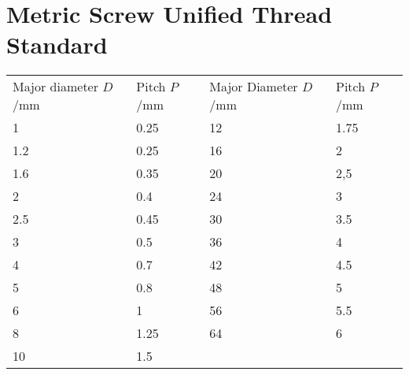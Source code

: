 \documentclass{article}
\begin{document}
\section{Metric Screw Unified Thread Standard}

\begin{tabular}{@{}llll@{}}
 Major diameter $D$/mm & Pitch $P$/mm & Major Diameter $D$/mm & Pitch $P$/mm \\
 1 & 0.25 & 12 & 1.75 \\
 1.2 & 0.25 & 16 & 2 \\
 1.6 & 0.35 & 20 & 2,5\\
 2 & 0.4 & 24 & 3 \\
 2.5 & 0.45 & 30 & 3.5\\
 3 & 0.5 & 36 & 4\\
 4 & 0.7 & 42 & 4.5\\
 5 & 0.8 & 48 & 5 \\
 6 & 1 & 56 & 5.5 \\
 8 & 1.25 & 64 & 6 \\
 10 & 1.5
\end{tabular}
\end{document}
